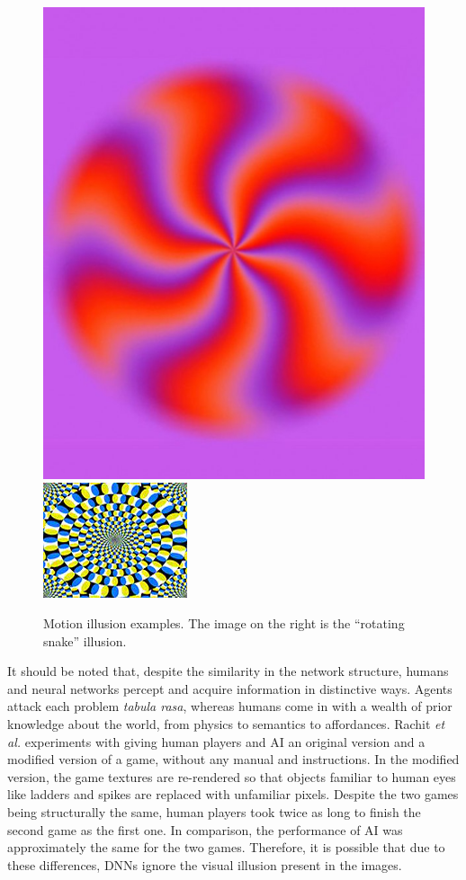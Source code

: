 \documentclass[journal]{IEEEtran}
\begin{document}
\begin{figure}[t]
  \centering
  \includegraphics[width=0.48\linewidth]{fig/illusion_eg.jpg}
  \includegraphics[width=0.48\linewidth]{fig/rotate-0.png}
  \caption{Motion illusion examples. The image on the right is the ``rotating snake'' illusion.}
  \label{fig:motion_example}
\end{figure}

It should be noted that, despite the similarity in the network structure, humans and neural networks percept and acquire information in distinctive ways. Agents attack each problem \textit{tabula rasa}, whereas humans come in with a wealth of prior knowledge about the world, from physics to semantics to affordances. Rachit \textit{et al.} \cite{dubey2018investigating} experiments with giving human players and AI an original version and a modified version of a game, without any manual and instructions. In the modified version, the game textures are re-rendered so that objects familiar to human eyes like ladders and spikes are replaced with unfamiliar pixels. Despite the two games being structurally the same, human players took twice as long to finish the second game as the first one. In comparison, the performance of AI was approximately the same for the two games. Therefore, it is possible that due to these differences, DNNs ignore the visual illusion present in the images.
\end{document}
